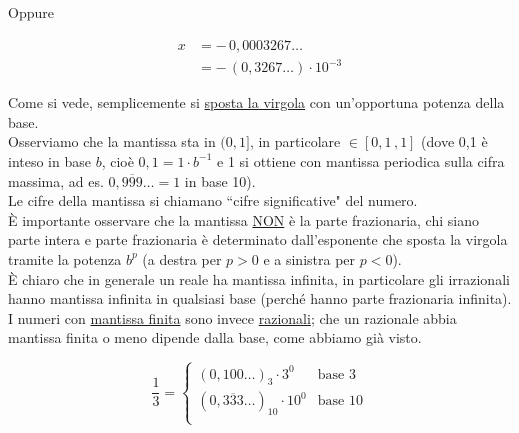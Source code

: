 Oppure
\begin{esempio}
\[\begin{split}
    x & = - \, 0,0003267 \dotsc \\
    & = - \, (0,3267 \dotsc) \cdot 10^{-3} 
\end{split}\]
\end{esempio}
Come si vede, semplicemente si \uline{sposta la virgola} con un'opportuna potenza della base. \\
Osserviamo che la mantissa sta in $(0,1]$, in particolare $\in [0,1 \, , 1]$ (dove 0,1 è inteso in base $b$, cioè $0,1 = 1 \cdot b^{-1}$ e 1 si ottiene con mantissa periodica sulla cifra massima, ad es. $0,\overline{999} \dotsc = 1$ in base 10). \\
Le cifre della mantissa si chiamano ``cifre significative" del numero. \\
È importante osservare che la mantissa \uline{NON} è la parte frazionaria, chi siano parte intera e parte frazionaria è determinato dall'esponente che sposta la virgola tramite la potenza $b^p$ (a destra per $p>0$ e a sinistra per $p<0$). \\
È chiaro che in generale un reale ha mantissa infinita, in particolare gli irrazionali hanno mantissa infinita in qualsiasi base (perché hanno parte frazionaria infinita). \\
I numeri con \uline{mantissa finita} sono invece \uline{razionali}; che un razionale abbia mantissa finita o meno dipende dalla base, come abbiamo già visto.
\begin{esempio} \end{esempio}
\[\frac{1}{3} = 
\begin{cases}
    (0,100 \dotsc)_3 \cdot 3^0 & \text{base 3} \\
    (0,\overline{333} \dotsc)_{10} \cdot 10^0 & \text{base 10} \\
\end{cases}
\]

